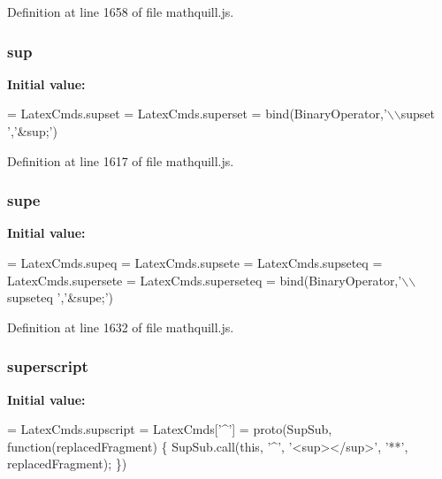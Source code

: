 Definition at line 1658 of file mathquill.\-js.

\subsubsection[{sup}]{ sup}\label{mathquill_8js_afd57ca60d70666976316bfa9317678d6}
{\bfseries Initial value\-:}
\begin{DoxyCode}
= LatexCmds.supset = LatexCmds.superset =
  bind(BinaryOperator,\textcolor{stringliteral}{'\(\backslash\)\(\backslash\)supset '},\textcolor{stringliteral}{'&sup;'})
\end{DoxyCode}


Definition at line 1617 of file mathquill.\-js.

\subsubsection[{supe}]{ supe}\label{mathquill_8js_a2a2830d36971b078e260f1986a2350fb}
{\bfseries Initial value\-:}
\begin{DoxyCode}
= LatexCmds.supeq =
LatexCmds.supsete = LatexCmds.supseteq =
LatexCmds.supersete = LatexCmds.superseteq =
  bind(BinaryOperator,\textcolor{stringliteral}{'\(\backslash\)\(\backslash\)supseteq '},\textcolor{stringliteral}{'&supe;'})
\end{DoxyCode}


Definition at line 1632 of file mathquill.\-js.

\subsubsection[{superscript}]{ superscript}\label{mathquill_8js_a5ca81ce4afd8a362c371f3cb0c544d13}
{\bfseries Initial value\-:}
\begin{DoxyCode}
=
LatexCmds.supscript =
LatexCmds[\textcolor{charliteral}{'^'}] = proto(SupSub, \textcolor{keyword}{function}(replacedFragment) \{
  SupSub.call(\textcolor{keyword}{this}, \textcolor{charliteral}{'^'}, \textcolor{stringliteral}{'<sup></sup>'}, \textcolor{stringliteral}{'**'}, replacedFragment);
\})
\end{DoxyCode}



